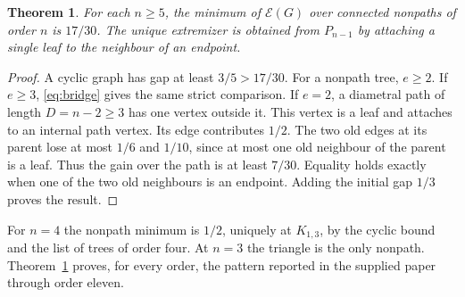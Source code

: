 \documentclass[11pt,a4paper]{article}
\newtheorem{theorem}{Theorem}[section]
\newcommand{\gap}{\mathcal{E}}
\begin{document}
\begin{theorem}\label{thm:nonpath}
For each $n\ge5$, the minimum of $\gap(G)$ over connected nonpaths of order $n$ is $17/30$. The unique extremizer is obtained from $P_{n-1}$ by attaching a single leaf to the neighbour of an endpoint.
\end{theorem}
\begin{proof}
A cyclic graph has gap at least $3/5>17/30$. For a nonpath tree, $e\ge2$. If $e\ge3$, \eqref{eq:bridge} gives the same strict comparison. If $e=2$, a diametral path of length $D=n-2\ge3$ has one vertex outside it. This vertex is a leaf and attaches to an internal path vertex. Its edge contributes $1/2$. The two old edges at its parent lose at most $1/6$ and $1/10$, since at most one old neighbour of the parent is a leaf. Thus the gain over the path is at least $7/30$. Equality holds exactly when one of the two old neighbours is an endpoint. Adding the initial gap $1/3$ proves the result.
\end{proof}
For $n=4$ the nonpath minimum is $1/2$, uniquely at $K_{1,3}$, by the cyclic bound and the list of trees of order four. At $n=3$ the triangle is the only nonpath. Theorem~\ref{thm:nonpath} proves, for every order, the pattern reported in the supplied paper through order eleven.
\end{document}
